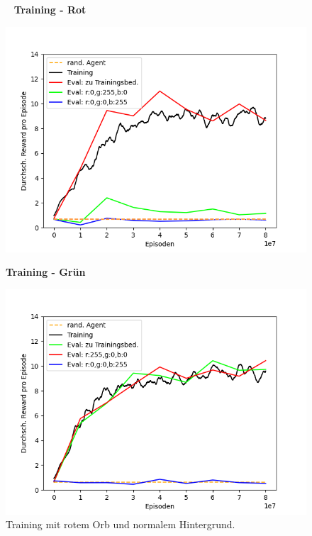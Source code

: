 \begin{figure}[htp!]
   \centering
   \captionsetup{width=0.48\linewidth} 
    \begin{minipage}{0.48\linewidth}
        \centering\
        \textbf{Training - Rot}\par
        \includegraphics[scale=.358]{abb/_graphen/floor_80Mio_inflvl_15_act_TrainingRot_evalRGB}
        \caption{Training mit rotem Orb und normalem Hintergrund.}
        \label{fig:grph_red_80Mio_200lvl_15act_Training_evalAsTraining}
    \end{minipage}
    \centering
    \begin{minipage}{0.48\linewidth}
        \centering
        \textbf{Training - Grün}\par%
        \includegraphics[scale=0.515]{abb/_graphen/floor_80Mio_inflvl_15_act_TrainingGreen_evalRGB} 

\end{minipage}
\end{figure}
